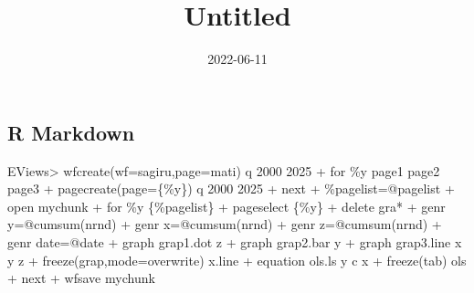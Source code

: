 \documentclass[
]{article}
\title{Untitled}
\author{}
\date{\vspace{-2.5em}2022-06-11}
\newenvironment{Shaded}{\begin{snugshade}}{\end{snugshade}}
\newcommand{\NormalTok}[1]{#1}
\begin{document}
\maketitle

{
\setcounter{tocdepth}{2}
\tableofcontents
}
\hypertarget{r-markdown}{%
\subsection{R Markdown}\label{r-markdown}}

\begin{Shaded}
\begin{Highlighting}[]
\NormalTok{EViews\textgreater{} wfcreate(wf=sagiru,page=mati) q 2000 2025}
\NormalTok{+ for \%y page1 page2 page3  }
\NormalTok{+ pagecreate(page=\{\%y\}) q 2000 2025}
\NormalTok{+ next}
\NormalTok{+ \%pagelist=@pagelist}
\NormalTok{+ \textquotesingle{}open mychunk}
\NormalTok{+ for \%y \{\%pagelist\}}
\NormalTok{+ pageselect \{\%y\}}
\NormalTok{+ delete gra*}
\NormalTok{+ genr y=@cumsum(nrnd)}
\NormalTok{+ genr x=@cumsum(nrnd)}
\NormalTok{+ genr z=@cumsum(nrnd)}
\NormalTok{+ genr date=@date}
\NormalTok{+                      graph grap1.dot z  }
\NormalTok{+                            graph grap2.bar y }
\NormalTok{+                            graph grap3.line x y z}
\NormalTok{+    freeze(grap,mode=overwrite) x.line}
\NormalTok{+ equation ols.ls y c x}
\NormalTok{+ freeze(tab) ols}
\NormalTok{+ next}
\NormalTok{+ wfsave mychunk}
\end{Highlighting}
\end{Shaded}
\end{document}
